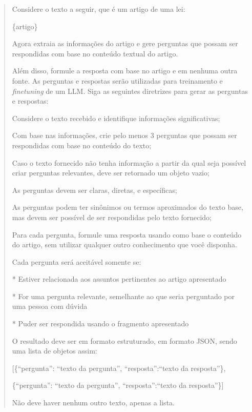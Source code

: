 \begin{quote}
{
    \footnotesize
    \ttfamily
    \raggedright
    \sloppy
    Considere o texto a seguir, que é um artigo de uma lei:
    
    \{artigo\}
    
    Agora extraia as informações do artigo e gere perguntas que possam ser respondidas com base no conteúdo textual do artigo.
    
    Além disso, formule a resposta com base no artigo e em nenhuma outra fonte. As perguntas e respostas serão utilizadas para treinamento e \textit{finetuning} de um LLM. Siga as seguintes diretrizes para gerar as perguntas e respostas:

    Considere o texto recebido e identifique informações significativas;
    
    Com base nas informações, crie pelo menos 3 perguntas que possam ser respondidas com base no conteúdo do texto;
    
    Caso o texto fornecido não tenha informação a partir da qual seja possível criar perguntas relevantes, deve ser retornado um objeto vazio;
    
    As perguntas devem ser claras, diretas, e específicas;
    
    As perguntas podem ter sinônimos ou termos aproximados do texto base, mas devem ser possível de ser respondidas pelo texto fornecido;
    
    Para cada pergunta, formule uma resposta usando como base o conteúdo do artigo, sem utilizar qualquer outro conhecimento que você disponha.

    Cada pergunta será aceitável somente se:

    * Estiver relacionada aos assuntos pertinentes ao artigo apresentado
    
    * For uma pergunta relevante, semelhante ao que seria perguntado por uma pessoa com dúvida
    
    * Puder ser respondida usando o fragmento apresentado

    O resultado deve ser em formato estruturado, em formato JSON, sendo uma lista de objetos assim:
    
    [\{``pergunta'': ``texto da pergunta'', ``resposta'':``texto da resposta''\},
    
     \{``pergunta'': ``texto da pergunta'', ``resposta'':``texto da resposta''\}]
    
    Não deve haver nenhum outro texto, apenas a lista.

}
\end{quote}
